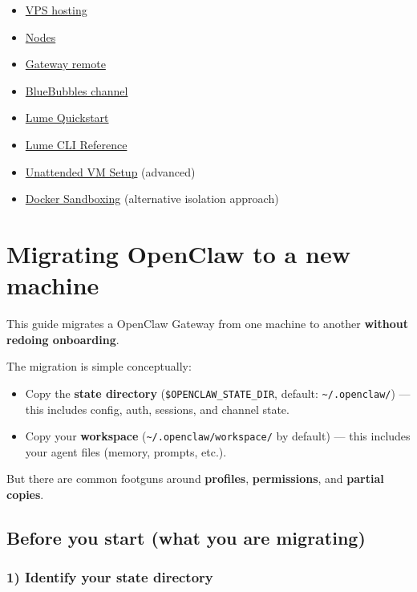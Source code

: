 \begin{itemize}
  \item \href{/vps}{VPS hosting}
  \item \href{/nodes}{Nodes}
  \item \href{/gateway/remote}{Gateway remote}
  \item \href{/channels/bluebubbles}{BlueBubbles channel}
  \item \href{https://cua.ai/docs/lume/guide/getting-started/quickstart}{Lume Quickstart}
  \item \href{https://cua.ai/docs/lume/reference/cli-reference}{Lume CLI Reference}
  \item \href{https://cua.ai/docs/lume/guide/fundamentals/unattended-setup}{Unattended VM Setup} (advanced)
  \item \href{/install/docker}{Docker Sandboxing} (alternative isolation approach)
\end{itemize}



\clearpage

\section{Migrating OpenClaw to a new machine}


This guide migrates a OpenClaw Gateway from one machine to another \textbf{without redoing onboarding}.

The migration is simple conceptually:

\begin{itemize}
  \item Copy the \textbf{state directory} (\texttt{\$OPENCLAW\_STATE\_DIR}, default: \texttt{\textasciitilde{}/.openclaw/}) — this includes config, auth, sessions, and channel state.
  \item Copy your \textbf{workspace} (\texttt{\textasciitilde{}/.openclaw/workspace/} by default) — this includes your agent files (memory, prompts, etc.).
\end{itemize}


But there are common footguns around \textbf{profiles}, \textbf{permissions}, and \textbf{partial copies}.

\subsection{Before you start (what you are migrating)}


\subsubsection{1) Identify your state directory}


